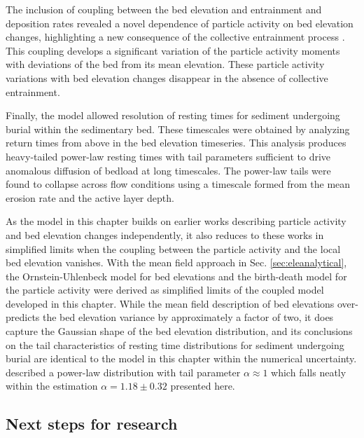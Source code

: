 The inclusion of coupling between the bed elevation and entrainment and deposition rates revealed a novel dependence of particle activity on bed elevation changes, highlighting a new consequence of the collective entrainment process \citep{Ancey2008,Lee2018}. This coupling develops a significant variation of the particle activity moments with deviations of the bed from its mean elevation. These particle activity variations with bed elevation changes disappear in the absence of collective entrainment.

Finally, the model allowed resolution of resting times for sediment undergoing burial within the sedimentary bed. These timescales were obtained by analyzing return times from above in the bed elevation timeseries.
This analysis produces heavy-tailed power-law resting times with tail parameters sufficient to drive anomalous diffusion of bedload at long timescales.
The power-law tails were found to collapse across flow conditions using a timescale formed from the mean erosion rate and the active layer depth.

As the model in this chapter builds on earlier works describing particle activity and bed elevation changes independently, it also reduces to these works in simplified limits when the coupling between the particle activity and the local bed elevation vanishes.
With the mean field approach in Sec. \ref{sec:eleanalytical}, the \citet{Martin2014} Ornstein-Uhlenbeck model for bed elevations and the \citet{Ancey2008} birth-death model for the particle activity were derived as simplified limits of the coupled model developed in this chapter.
While the mean field description of bed elevations over-predicts the bed elevation variance by approximately a factor of two, it does capture the Gaussian shape of the bed elevation distribution, and its conclusions on the tail characteristics of resting time distributions for sediment undergoing burial are identical to the model in this chapter within the numerical uncertainty.
\citet{Martin2014} described a power-law distribution with tail parameter $\alpha \approx 1$ which falls neatly within the estimation $\alpha = 1.18 \pm 0.32$ presented here.


\subsection{Next steps for research}

